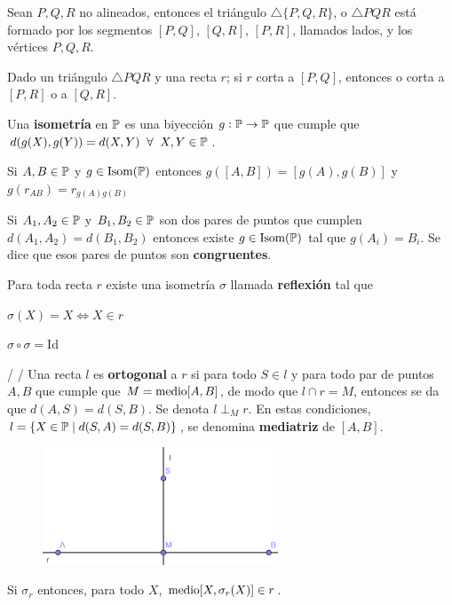  Sean $P, Q, R$ no alineados, entonces el triángulo $\triangle\{P,Q,R\}$, o $\triangle PQR$ está formado por los segmentos $[P,Q]$, $[Q,R]$, $[P,R]$, llamados lados, y los vértices $P,Q, R$.

 Dado un triángulo $\triangle PQR$ y una recta $r$; si $r$ corta a $[P,Q]$, entonces o corta a $[P,R]$ o a $[Q, R]$.

 Una \textbf{isometría} en $\P$ es una biyección $g: \P \rightarrow \P$ que cumple que $d(g(X), g(Y)) = d(X,Y) \;\;\forall\;\; X,Y \in \P$.

 Si $A,B \in \P$ y $g \in \iso(\P)$ entonces $g([A,B]) = [g(A), g(B)]$ y $g(r_{AB}) = r_{g(A)g(B)}$ 

 Si $A_1, A_2 \in \P$ y $B_1, B_2 \in \P$ son dos pares de puntos que cumplen $d(A_1,A_2) = d(B_1,B_2)$ entonces existe $g \in \iso(\P)$ tal que $g(A_i) = B_i$. Se dice que esos pares de puntos son \textbf{congruentes}.

 Para toda recta $r$ existe una isometría $\sigma$ llamada \textbf{reflexión} tal que  
\begin{itemizex}
	\item $\sigma(X) = X\iff X \in r$
	\item $\sigma \circ \sigma = \text{Id}$
\end{itemizex}


 /  /  Una recta $l$ es \textbf{ortogonal} a $r$ si para todo $S \in l$ y para todo par de puntos $A, B$ que cumple que $M = \m[A,B]$, de modo que $l \cap r = M$, entonces se da que $d(A,S) = d(S,B)$. Se denota $l \perp_M r$. En estas condiciones, $l = \{X \in \P \; | \; d(S,A) = d(S,B)\}$, se denomina \textbf{mediatriz} de $[A,B]$. 

\begin{figure}[H]
	\centering
	\includegraphics[width=7cm]{figuras/2-23.png}
	\vspace{-1em}
\end{figure}

 Si $\sigma_r$ entonces, para todo $X$, $\m[X, \sigma_r(X)] \in r$.

